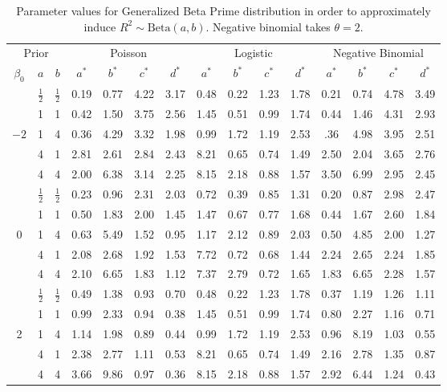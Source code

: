 \documentclass[12pt]{article}
\begin{document}
\begin{table}
    \centering
    \begin{tabular}{ccc|cccc|cccc|cccc}
    \multicolumn{3}{c|}{Prior} &
    \multicolumn{4}{c|}{Poisson}& \multicolumn{4}{c|}{Logistic}&
    \multicolumn{4}{c}{Negative Binomial}\\
         $\beta_0$ & $a$ & $b$ & $a^*$ & $b^*$ & $c^*$ & $d^*$ & $a^*$ & $b^*$ & $c^*$ & $d^*$ & $a^*$ & $b^*$ & $c^*$ & $d^*$ \\\hline
         & $\frac12$ & $\frac12$ &
        0.19 & 0.77 & 4.22 & 3.17 & 0.48 & 0.22 & 1.23 & 1.78 & 0.21 & 0.74 & 4.78 & 3.49\\
         & 1 & 1 &
          0.42 & 1.50 & 3.75 & 2.56 & 1.45 & 0.51 & 0.99 & 1.74 & 0.44 & 1.46 & 4.31 & 2.93\\
        $-2$ & 1 & 4 &
            0.36 & 4.29 & 3.32 & 1.98 & 0.99 & 1.72 & 1.19 & 2.53 & .36 & 4.98 & 3.95 & 2.51\\
         & 4 & 1 &
          2.81 & 2.61 & 2.84 & 2.43 & 8.21 & 0.65 & 0.74 & 1.49 & 2.50 & 2.04 & 3.65 & 2.76\\
         & 4 & 4 &
            2.00 & 6.38 & 3.14 & 2.25 & 8.15 & 2.18 & 0.88 & 1.57 & 3.50 & 6.99 & 2.95 & 2.45    \\\hline
         & $\frac12$ & $\frac12$ &
           0.23 & 0.96 & 2.31 & 2.03 & 0.72 & 0.39 & 0.85 & 1.31 & 0.20 & 0.87 & 2.98 & 2.47\\
         & 1 & 1 &
            0.50 & 1.83 & 2.00 & 1.45 & 1.47 & 0.67 & 0.77 & 1.68 & 0.44 & 1.67 & 2.60 & 1.84\\
        0 & 1 & 4 &
            0.63 & 5.49 & 1.52 & 0.95 & 1.17 & 2.12 & 0.89 & 2.03 & 0.50 & 4.85 & 2.00 & 1.27\\
         & 4 & 1 &
            2.08 & 2.68 & 1.92 & 1.53 & 7.72 & 0.72 & 0.68 & 1.44 & 2.24 & 2.65 & 2.24 & 1.85\\
         & 4 & 4 &
            2.10 & 6.65 & 1.83 & 1.12 & 7.37 & 2.79 & 0.72 & 1.65 & 1.83 & 6.65 & 2.28 & 1.57    \\\hline
         & $\frac12$ & $\frac12$ &
            0.49 & 1.38 & 0.93 & 0.70 & 0.48 & 0.22 & 1.23 & 1.78 & 0.37 & 1.19 & 1.26 & 1.11\\
         & 1 & 1 &
            0.99 & 2.33 & 0.94 & 0.38 & 1.45 & 0.51 & 0.99 & 1.74 & 0.80 & 2.27 & 1.16 & 0.71\\
        2 & 1 & 4 &
            1.14 & 1.98 & 0.89 & 0.44 & 0.99 & 1.72 & 1.19 & 2.53 & 0.96 & 8.19 & 1.03 & 0.55\\
         & 4 & 1 &
            2.38 & 2.77 & 1.11 & 0.53 & 8.21 & 0.65 & 0.74 & 1.49 & 2.16 & 2.78 & 1.35 & 0.87\\
         & 4 & 4 &
           3.66 & 9.86 & 0.97 & 0.36 & 8.15 & 2.18 & 0.88 & 1.57 & 2.92 & 6.44 & 1.24 & 0.43
    \end{tabular}
    \caption{Parameter values for Generalized Beta Prime distribution in order to approximately induce $R^2\sim\mbox{Beta}(a,b)$. Negative binomial takes $\theta=2$.}
    \label{tab:GBP}
\end{table}
\end{document}
